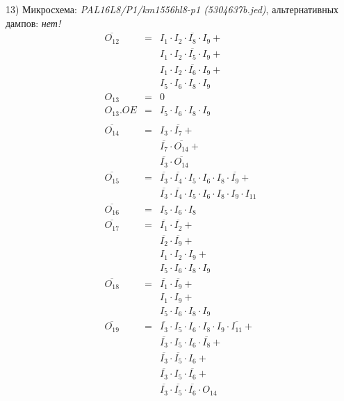 \documentclass[a4paper,russian]{report}
\begin{document}
13) Микросхема: \emph{PAL16L8/P1/km1556hl8-p1  (5304637b.jed)}, альтернативных дампов: \emph{нет!}
\nopagebreak\begin{eqnarray*}
    \overline{O_{12}} & = & I_{1} \cdotp I_{2} \cdotp \overline{I_{8}} \cdotp I_{9} + \\
	& &  I_{1} \cdotp I_{2} \cdotp \overline{I_{5}} \cdotp I_{9} + \\
	& &  I_{1} \cdotp I_{2} \cdotp \overline{I_{6}} \cdotp I_{9} + \\
	& &  I_{5} \cdotp I_{6} \cdotp I_{8} \cdotp I_{9} \\
    O_{13} & = & 0 \\
    O_{13}.OE & = & I_{5} \cdotp I_{6} \cdotp I_{8} \cdotp I_{9} \\ \\
    \overline{O_{14}} & = & I_{3} \cdotp \overline{I_{7}} + \\
	& &  \overline{I_{7}} \cdotp \overline{O_{14}} + \\
	& &  \overline{I_{3}} \cdotp \overline{O_{14}} \\
    \overline{O_{15}} & = & \overline{I_{3}} \cdotp \overline{I_{4}} \cdotp I_{5} \cdotp I_{6} \cdotp I_{8} \cdotp \overline{I_{9}} + \\
	& &  \overline{I_{3}} \cdotp \overline{I_{4}} \cdotp I_{5} \cdotp I_{6} \cdotp I_{8} \cdotp I_{9} \cdotp I_{11} \\
    \overline{O_{16}} & = & I_{5} \cdotp I_{6} \cdotp I_{8} \\
    \overline{O_{17}} & = & \overline{I_{1}} \cdotp \overline{I_{2}} + \\
	& &  \overline{I_{2}} \cdotp \overline{I_{9}} + \\
	& &  I_{1} \cdotp I_{2} \cdotp I_{9} + \\
	& &  I_{5} \cdotp I_{6} \cdotp I_{8} \cdotp I_{9} \\
    \overline{O_{18}} & = & \overline{I_{1}} \cdotp \overline{I_{9}} + \\
	& &  I_{1} \cdotp I_{9} + \\
	& &  I_{5} \cdotp I_{6} \cdotp I_{8} \cdotp I_{9} \\
    \overline{O_{19}} & = & \overline{I_{3}} \cdotp I_{5} \cdotp I_{6} \cdotp I_{8} \cdotp I_{9} \cdotp \overline{I_{11}} + \\
	& &  \overline{I_{3}} \cdotp I_{5} \cdotp I_{6} \cdotp \overline{I_{8}} + \\
	& &  \overline{I_{3}} \cdotp \overline{I_{5}} \cdotp I_{6} + \\
	& &  \overline{I_{3}} \cdotp I_{5} \cdotp \overline{I_{6}} + \\
	& &  \overline{I_{3}} \cdotp \overline{I_{5}} \cdotp \overline{I_{6}} \cdotp O_{14} \\
 \end{eqnarray*}
\pagebreak[1]
\end{document}
